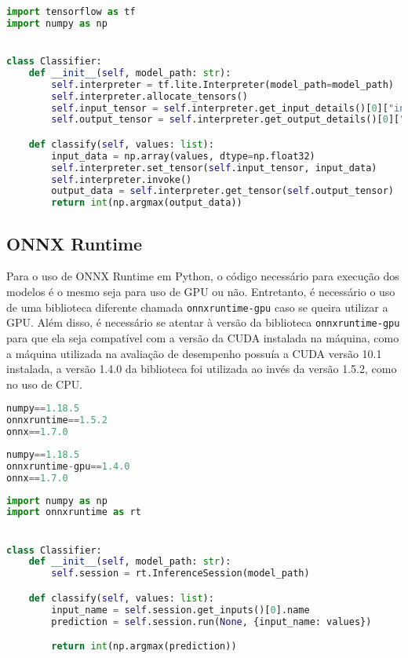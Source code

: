 \begin{lstlisting}[language=Python, caption=Classificador implementado em Python utilizando TensorFlow Lite]
import tensorflow as tf
import numpy as np


class Classifier:
    def __init__(self, model_path: str):
        self.interpreter = tf.lite.Interpreter(model_path=model_path)
        self.interpreter.allocate_tensors()
        self.input_tensor = self.interpreter.get_input_details()[0]["index"]
        self.output_tensor = self.interpreter.get_output_details()[0]["index"]

    def classify(self, values: list):
        input_data = np.array(values, dtype=np.float32)
        self.interpreter.set_tensor(self.input_tensor, input_data)
        self.interpreter.invoke()
        output_data = self.interpreter.get_tensor(self.output_tensor)
        return int(np.argmax(output_data))
\end{lstlisting}

\subsection{ONNX Runtime}

Para o uso de ONNX Runtime em Python, o código necessário para execução dos modelos é o mesmo seja para uso de GPU ou não. Entretanto, é necessário o uso de uma biblioteca diferente chamada \texttt{onnxruntime-gpu} caso se queira utilizar a GPU. Além disso, é necessário se atentar à versão da biblioteca \texttt{onnxruntime-gpu} para que ela seja compatível com a versão da CUDA instalada na máquina, como a máquina utilizada na avaliação de desempenho possuía a CUDA versão 10.1 instalada, a versão 1.4.0 da biblioteca foi utilizada ao invés da versão 1.5.2, como no uso de CPU.

\begin{lstlisting}[language=Python, caption=Dependências PIP para uso de ONNX Runtime sem GPU]
numpy==1.18.5
onnxruntime==1.5.2
onnx==1.7.0
\end{lstlisting}

\begin{lstlisting}[language=Python, caption=Dependências PIP para uso de ONNX Runtime com GPU]
numpy==1.18.5
onnxruntime-gpu==1.4.0
onnx==1.7.0
\end{lstlisting}

\begin{lstlisting}[language=Python, caption=Classificador implementado em Python utilizando ONNX Runtime]
import numpy as np
import onnxruntime as rt


class Classifier:
    def __init__(self, model_path: str):
        self.session = rt.InferenceSession(model_path)

    def classify(self, values: list):
        input_name = self.session.get_inputs()[0].name
        prediction = self.session.run(None, {input_name: values})

        return int(np.argmax(prediction))
\end{lstlisting}